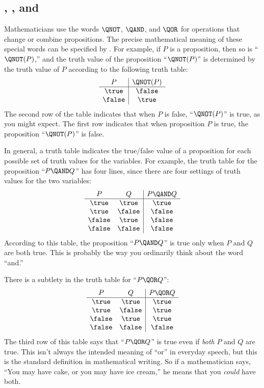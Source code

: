 \subsection{\QNOT, \QAND, and \QOR}

 Mathematicians use the words $\QNOT$, $\QAND$, and $\QOR$
for operations that change or combine propositions.  The precise
mathematical meaning of these special words can be specified by
.  For example, if $P$ is a proposition,
then so is ``$\QNOT(P)$,'' and the truth value of the proposition
``$\QNOT(P)$'' is determined by the truth value of $P$ according to the
following truth table:
%
\[
\begin{array}{c|c}
P & \QNOT(P) \\ \hline
\true & \false \\
\false & \true \\
\end{array}
\]
%
The second row of the table indicates that when $P$ is false,
``$\QNOT(P)$'' is true, as you might expect.  The first row indicates that
when proposition $P$ is true, the proposition ``$\QNOT(P)$'' is false.

In general, a truth table indicates the true/false value of a proposition
 for each possible set of truth
values for the variables.  For example, the truth table for the
proposition ``$P \QAND Q$'' has four lines, since there are four settings
of truth values for the two variables:
%
\[
\begin{array}{cc|c}
P & Q & P \QAND Q \\ \hline
\true & \true & \true \\
\true & \false & \false \\
\false & \true & \false \\
\false & \false & \false
\end{array}
\]
%
According to this table, the proposition ``$P \QAND Q$'' is true only when
$P$ and $Q$ are both true.  This is probably the way you ordinarily think
about the word ``and.''

There is a subtlety in the truth table for ``$P \QOR Q$'':
%
\[
\begin{array}{cc|c}
P & Q & P \QOR Q \\ \hline
\true & \true & \true \\
\true & \false & \true \\
\false & \true & \true \\
\false & \false & \false
\end{array}
\]
%
The third row of this table says that ``$P \QOR Q$'' is true even if
\emph{both} $P$ and $Q$ are true.  This isn't always the intended
meaning of ``or'' in everyday speech, but this is the standard definition
in mathematical writing.  So if a mathematician says, ``You may have cake,
or you may have ice cream,'' he means that you \emph{could} have both.

